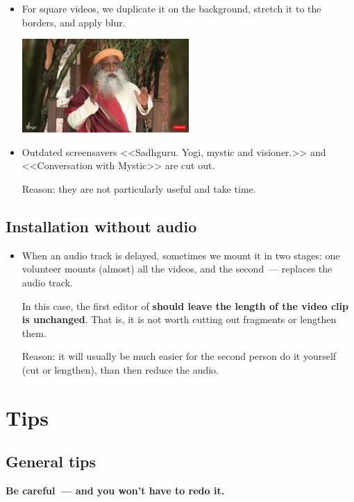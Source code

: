 \documentclass[
a4paper, %
12pt, %
article,
onecolumn, %
openany, %
]{memoir}
\begin{document}
\begin{itemize}

\item For square videos, we duplicate it on the background, stretch it to the borders,
and apply blur.
\begin{center} \includegraphics[width=0.5\textwidth]{tooWide} \end{center}

\item Outdated screensavers <<Sadhguru. Yogi, mystic and visioner.>> and
<<Conversation with Mystic>> are cut out.

{\color{gray}Reason: they are not particularly useful and take time.}
\end{itemize}


\subsection{Installation without audio}

\begin{itemize}
\item When an audio track is delayed, sometimes we mount it in two
stages: one volunteer mounts (almost) all the videos, and
the second~--- replaces the audio track.

In this case, the first editor of \textbf{should leave
the length of the video clip is unchanged}. That is, it is not worth cutting out
fragments or lengthen them.

Reason: it will usually be much easier for the second person
do it yourself (cut or lengthen), than then reduce the audio.
\end{itemize}

\newpage
\section{Tips}\label{advices}

\subsection{General tips}
\textbf{Be careful~--- and you won't have to redo it.}
\end{document}
